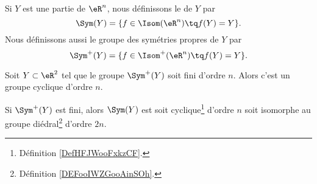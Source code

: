 \begin{definition}
    Si \( Y\) est une partie de \( \eR^n\), nous définissons le  de \( Y\) par
    \begin{equation}
        \Sym(Y)=\{ f\in\Isom(\eR^n)\tq f(Y)=Y \}.
    \end{equation}
    Nous définissons aussi le groupe des symétries propres de \( Y\) par
    \begin{equation}
        \Sym^+(Y)=\{ f\in\Isom^+(\eR^n)\tq f(Y)=Y \}.
    \end{equation}
\end{definition}

\begin{theorem}      \label{THOooAYZVooPmCiWI}
    Soit \( Y\subset \eR^2\) tel que le groupe \( \Sym^+(Y)\) soit fini d'ordre \( n\). Alors c'est un groupe cyclique d'ordre \( n\).

    Si \( \Sym^+(Y)\) est fini, alors \( \Sym(Y)\) est soit cyclique\footnote{Définition \ref{DefHFJWooFxkzCF}.} d'ordre \( n\) soit isomorphe au groupe diédral\footnote{Définition \ref{DEFooIWZGooAinSOh}.} d'ordre \( 2n\).
\end{theorem}

